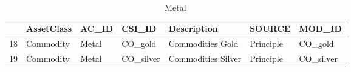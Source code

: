 \begin{longtable}{rllllll}
\caption{Metal} \\ 
  \hline
 & AssetClass & AC\_ID & CSI\_ID & Description & SOURCE & MOD\_ID \\ 
  \hline
18 & Commodity & Metal & CO\_gold & Commodities Gold & Principle & CO\_gold \\ 
  19 & Commodity & Metal & CO\_silver & Commodities Silver & Principle & CO\_silver \\ 
   \hline
\hline
\end{longtable}
